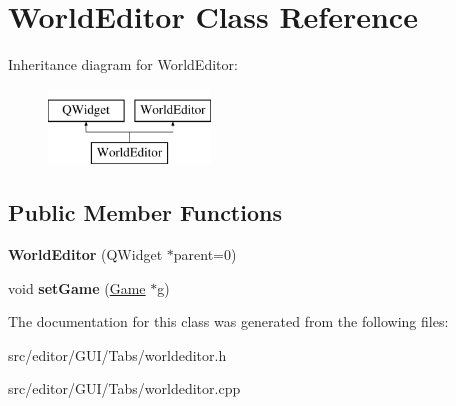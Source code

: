 \hypertarget{class_world_editor}{}\section{World\+Editor Class Reference}
\label{class_world_editor}
Inheritance diagram for World\+Editor\+:\begin{figure}[H]
\begin{center}
\leavevmode
\includegraphics[height=2.000000cm]{class_world_editor}
\end{center}
\end{figure}
\subsection*{Public Member Functions}
\begin{DoxyCompactItemize}
\item 
\hypertarget{class_world_editor_a92603770ba42ee0fe5e28e28c7ff8ac4}{}\label{class_world_editor_a92603770ba42ee0fe5e28e28c7ff8ac4} 
{\bfseries World\+Editor} (Q\+Widget $\ast$parent=0)
\item 
\hypertarget{class_world_editor_a673feffa8f6fb325ed4cea23c6f340ae}{}\label{class_world_editor_a673feffa8f6fb325ed4cea23c6f340ae} 
void {\bfseries set\+Game} (\hyperlink{class_game}{Game} $\ast$g)
\end{DoxyCompactItemize}


The documentation for this class was generated from the following files\+:\begin{DoxyCompactItemize}
\item 
src/editor/\+G\+U\+I/\+Tabs/worldeditor.\+h\item 
src/editor/\+G\+U\+I/\+Tabs/worldeditor.\+cpp\end{DoxyCompactItemize}

